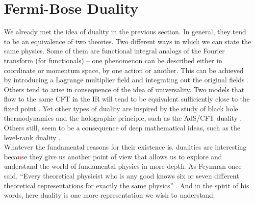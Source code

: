         \section{Fermi-Bose Duality} \label{Fermi-Bose_sec}
        We already met the idea of duality in the previous section. In general, they tend to be an equivalence of two theories. Two different ways in which we can state the same physics. Some of them are functional integral analogs of the Fourier transform (for functionals) -- one phenomenon can be described either in coordinate or momentum space, by one action or another. This can be achieved by introducing a Lagrange multiplier field and integrating out the original fields \textcolor{red}{\cite{Barci:1995iy, Burgess:1993np}}. Others tend to arise in consequence of the idea of universality. Two models that flow to the same CFT in the IR will tend to be equivalent sufficiently close to the fixed point \textcolor{red}{\cite{Seiberg:1994bz, Seiberg:1994rs}}.
        Yet other types of duality are inspired by the study of black hole thermodynamics and the holographic principle, such as the AdS/CFT duality \textcolor{red}{\cite{Maldacena:1997re}}. Others still, seem to be a consequence of deep mathematical ideas, such as the level-rank duality \textcolor{red}{\cite{Nakanishi:1990hj, Mlawer:1990uv, Naculich:2007nc, Naculich:1990pa, Camperi:1990dk}}.\\
        \indent Whatever the fundamental reasons for their existence is, dualities are interesting beca\textcolor{red}{u}se they give us another point of view that allows us to explore and understand the world of fundamental physics in more depth. As Feynman once said, ``Every theoretical physicist who is any good knows six or seven different theoretical representations for exactly the same physics'' \cite{Feynman_quote}. And in the spirit of his words, here duality is one more representation we wish to understand.\\
